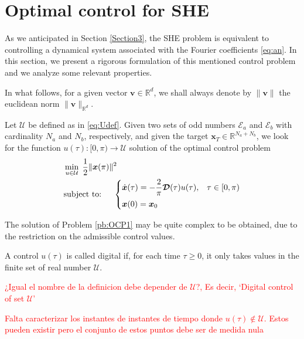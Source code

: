 \section{Optimal control for SHE}\label{Section4}

As we anticipated in Section \ref{Section3}, the SHE problem is equivalent to controlling a dynamical system associated with the Fourier coefficients \eqref{eq:an}. In this section, we present a rigorous formulation of this mentioned control problem and we analyze some relevant properties. 

In what follows, for a given vector $\bm{v}\in\mathbb{R}^d$, we shall always denote by $\|\bm{v}\|$ the euclidean norm $\|\bm{v}\|_{\mathbb{R}^d}$.
\newline


\begin{problem}\label{pb:OCP1}
Let $\mathcal U$ be defined as in \eqref{eq:Udef}. Given two sets of odd numbers $\mathcal {E}_a $ and $\mathcal {E}_b $ with cardinality $N_a$ and $N_b$, respectively, and given the target $\bm{x}_T\in \mathbb{R}^{N_a+N_b}$, we look for the function $u(\tau):[0,\pi)\to \mathcal U$ solution of the optimal control problem  
\begin{align*}
	&\min_{u \in \mathcal{U}}\;\frac 12 \|\bm{x}(\pi)\|^2
	\\
    &\notag \text{subject to: }\quad \begin{cases}
            \displaystyle \dot{\bm{x}}(\tau) = -\frac 2\pi\bm{\mathcal{D}}(\tau) u(\tau),  & \tau \in [0,\pi)\\[6pt]
            \bm{x}(0) = \bm{x}_0
    \end{cases}
    \end{align*}
\end{problem}
The solution of Problem \ref{pb:OCP1} may be quite complex to be obtained, due to the restriction on the admissible control values. 

\begin{definition}
A control $u(\tau)$ is called digital if, for each time $\tau\geq 0$, it only takes values in the finite set of real number $\mathcal{U}$.  
\end{definition}
\textcolor{red}{¿Igual el nombre de la definicion debe depender de $\mathcal{U}$?, Es decir, `Digital control of set $\mathcal{U}$'}

\textcolor{red}{Falta caracterizar los instantes de instantes de tiempo donde $u(\tau) \notin \mathcal{U}$. Estos pueden existir pero el conjunto de estos puntos debe ser de medida nula}


